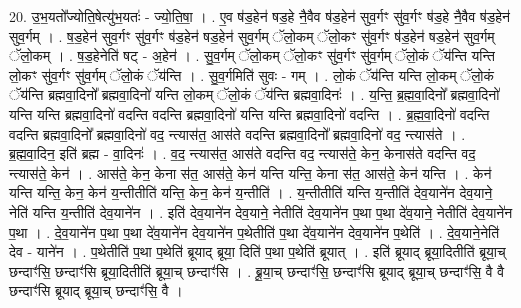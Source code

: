 \documentclass[17pt]{extarticle}
\begin{document}
20. उ॒भ॒यतो᳚ज्योति॒षेत्यु॑भ॒यतः॑ - ज्यो॒ति॒षा॒ । . ए॒व ष॑ड॒हेन॑ षड॒हे नै॒वैव ष॑ड॒हेन॑ सुव॒र्गꣳ सु॑व॒र्गꣳ ष॑ड॒हे नै॒वैव ष॑ड॒हेन॑ सुव॒र्गम् । . ष॒ड॒हेन॑ सुव॒र्गꣳ सु॑व॒र्गꣳ ष॑ड॒हेन॑ षड॒हेन॑ सुव॒र्गम् ॅलो॒कम् ॅलो॒कꣳ सु॑व॒र्गꣳ ष॑ड॒हेन॑ षड॒हेन॑ सुव॒र्गम् ॅलो॒कम् । . ष॒ड॒हेनेति॑ षट् - अ॒हेन॑ । . सु॒व॒र्गम् ॅलो॒कम् ॅलो॒कꣳ सु॑व॒र्गꣳ सु॑व॒र्गम् ॅलो॒कं ॅय॑न्ति यन्ति लो॒कꣳ सु॑व॒र्गꣳ सु॑व॒र्गम् ॅलो॒कं ॅय॑न्ति । . सु॒व॒र्गमिति॑ सुवः - गम् । . लो॒कं ॅय॑न्ति यन्ति लो॒कम् ॅलो॒कं ॅय॑न्ति ब्रह्मवा॒दिनो᳚ ब्रह्मवा॒दिनो॑ यन्ति लो॒कम् ॅलो॒कं ॅय॑न्ति ब्रह्मवा॒दिनः॑ । . य॒न्ति॒ ब्र॒ह्म॒वा॒दिनो᳚ ब्रह्मवा॒दिनो॑ यन्ति यन्ति ब्रह्मवा॒दिनो॑ वदन्ति वदन्ति ब्रह्मवा॒दिनो॑ यन्ति यन्ति ब्रह्मवा॒दिनो॑ वदन्ति । . ब्र॒ह्म॒वा॒दिनो॑ वदन्ति वदन्ति ब्रह्मवा॒दिनो᳚ ब्रह्मवा॒दिनो॑ वद॒ न्त्यास॑त॒ आस॑ते वदन्ति ब्रह्मवा॒दिनो᳚ ब्रह्मवा॒दिनो॑ वद॒ न्त्यास॑ते । . ब्र॒ह्म॒वा॒दिन॒ इति॑ ब्रह्म - वा॒दिनः॑ । . व॒द॒ न्त्यास॑त॒ आस॑ते वदन्ति वद॒ न्त्यास॑ते॒ केन॒ केनास॑ते वदन्ति वद॒ न्त्यास॑ते॒ केन॑ । . आस॑ते॒ केन॒ केना स॑त॒ आस॑ते॒ केन॑ यन्ति यन्ति॒ केना स॑त॒ आस॑ते॒ केन॑ यन्ति । . केन॑ यन्ति यन्ति॒ केन॒ केन॑ य॒न्तीतीति॑ यन्ति॒ केन॒ केन॑ य॒न्तीति॑ । . य॒न्तीतीति॑ यन्ति य॒न्तीति॑ देव॒याने॑न देव॒याने॒ नेति॑ यन्ति य॒न्तीति॑ देव॒याने॑न । . इति॑ देव॒याने॑न देव॒याने॒ नेतीति॑ देव॒याने॑न प॒था प॒था दे॑व॒याने॒ नेतीति॑ देव॒याने॑न प॒था । . दे॒व॒याने॑न प॒था प॒था दे॑व॒याने॑न देव॒याने॑न प॒थेतीति॑ प॒था दे॑व॒याने॑न देव॒याने॑न प॒थेति॑ । . दे॒व॒याने॒नेति॑ देव - याने॑न । . प॒थेतीति॑ प॒था प॒थेति॑ ब्रूयाद् ब्रूया॒ दिति॑ प॒था प॒थेति॑ ब्रूयात् । . इति॑ ब्रूयाद् ब्रूया॒दितीति॑ ब्रूया॒च् छन्दाꣳ॑सि॒ छन्दाꣳ॑सि ब्रूया॒दितीति॑ ब्रूया॒च् छन्दाꣳ॑सि । . ब्रू॒या॒च् छन्दाꣳ॑सि॒ छन्दाꣳ॑सि ब्रूयाद् ब्रूया॒च् छन्दाꣳ॑सि॒ वै वै छन्दाꣳ॑सि ब्रूयाद् ब्रूया॒च् छन्दाꣳ॑सि॒ वै । \newline
\end{document}
